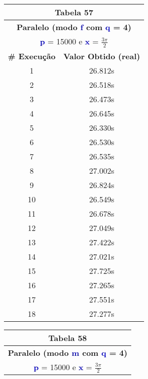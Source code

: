 \documentclass[11pt]{article}
\begin{document}
\begin{table}[!h]
	\begin{center}
		\begin{minipage}{0.48\textwidth}
			\begin{tabular}{| c | c |}
			\hline
			\multicolumn{2}{|c|}{\textbf{Tabela 57}} \\ \hline
			\multicolumn{2}{|c|}{\textbf{Paralelo (modo \textbf{\textcolor{blue}{f}} com \textbf{\textcolor{blue}{q}} = 4)}} \\
			\multicolumn{2}{|c|}{\textbf{\textcolor{blue}{p}} = 15000 e \textbf{\textcolor{blue}{x}} = $\frac{3\pi}{2}$} \\ [0.2ex]
			\hline
				\textbf{\# Execução} &  \textbf{Valor Obtido (real)} \\ \hline
				1 & 26.812s \\ \hline
				2 & 26.518s \\ \hline
				3 & 26.473s \\ \hline
				4 & 26.645s \\ \hline
				5 & 26.330s \\ \hline
				6 & 26.530s \\ \hline
				7 & 26.535s \\ \hline
				8 & 27.002s \\ \hline
				9 & 26.824s \\ \hline
				10 & 26.549s \\ \hline
				11 & 26.678s \\ \hline
				12 & 27.049s \\ \hline
				13 & 27.422s \\ \hline
				14 & 27.021s \\ \hline
				15 & 27.725s \\ \hline
				16 & 27.265s \\ \hline
				17 & 27.551s \\ \hline
				18 & 27.277s \\ \hline
			\end{tabular}
		\end{minipage}
		\begin{minipage}{0.48\textwidth}
			\begin{tabular}{| c | c |}
			\hline
			\multicolumn{2}{|c|}{\textbf{Tabela 58}} \\ \hline
			\multicolumn{2}{|c|}{\textbf{Paralelo (modo \textbf{\textcolor{blue}{m}} com \textbf{\textcolor{blue}{q}} = 4)}} \\
			\multicolumn{2}{|c|}{\textbf{\textcolor{blue}{p}} = 15000 e \textbf{\textcolor{blue}{x}} = $\frac{3\pi}{2}$} \\ [0.2ex]

\end{tabular}
\end{minipage}
\end{center}
\end{table}
\end{document}
